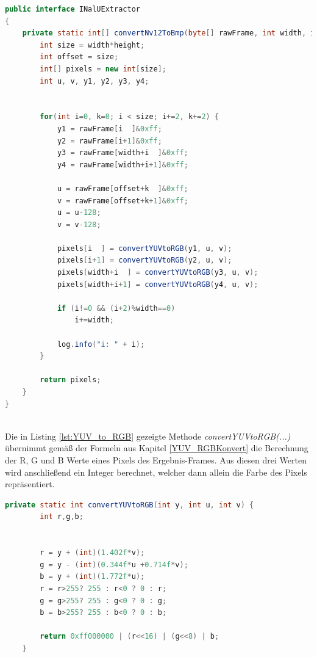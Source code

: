 \begin{lstlisting}[caption=Methode \textit{convertNv12ToBmp()} zur Überführung eines Byte-Arrays im NV12-Format in ein Bitmap-Objekt, label=lst:NV12_to_BMP, language=Java]
public interface INalUExtractor
{
    private static int[] convertNv12ToBmp(byte[] rawFrame, int width, int height) {
        int size = width*height;
        int offset = size;
        int[] pixels = new int[size];
        int u, v, y1, y2, y3, y4;


        for(int i=0, k=0; i < size; i+=2, k+=2) {
            y1 = rawFrame[i  ]&0xff;
            y2 = rawFrame[i+1]&0xff;
            y3 = rawFrame[width+i  ]&0xff;
            y4 = rawFrame[width+i+1]&0xff;

            u = rawFrame[offset+k  ]&0xff;
            v = rawFrame[offset+k+1]&0xff;
            u = u-128;
            v = v-128;

            pixels[i  ] = convertYUVtoRGB(y1, u, v);
            pixels[i+1] = convertYUVtoRGB(y2, u, v);
            pixels[width+i  ] = convertYUVtoRGB(y3, u, v);
            pixels[width+i+1] = convertYUVtoRGB(y4, u, v);

            if (i!=0 && (i+2)%width==0)
                i+=width;

            log.info("i: " + i);
        }

        return pixels;
    }
}
\end{lstlisting}

~\\
Die in Listing \ref{lst:YUV_to_RGB} gezeigte Methode \textit{convertYUVtoRGB(...)} übernimmt gemäß der Formeln aus Kapitel \ref{YUV_RGBKonvert} die Berechnung der R, G und B Werte eines Pixels des Ergebnis-Frames. Aus diesen drei Werten wird anschließend ein Integer berechnet, welcher dann allein die Farbe des Pixels repräsentiert.
\clearpage

\begin{lstlisting}[caption=Methode \textit{convertYUVtoRGB(...)} zur Umrechnung eines Pixels aus dem YUV-Farbraum in den RGB-Farbraum, label=lst:YUV_to_RGB, language=Java]
private static int convertYUVtoRGB(int y, int u, int v) {
        int r,g,b;


        r = y + (int)(1.402f*v);
        g = y - (int)(0.344f*u +0.714f*v);
        b = y + (int)(1.772f*u);
        r = r>255? 255 : r<0 ? 0 : r;
        g = g>255? 255 : g<0 ? 0 : g;
        b = b>255? 255 : b<0 ? 0 : b;

        return 0xff000000 | (r<<16) | (g<<8) | b;
    }
\end{lstlisting}

